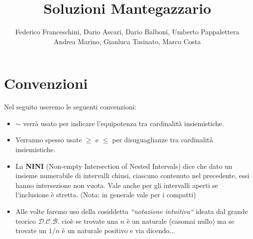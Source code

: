 \documentclass[a4paper,11pt]{article}
\title{Soluzioni Mantegazzario}
\author{Federico Franceschini, Dario Ascari, Dario Balboni, Umberto Pappalettera \\ 
Andrea Marino, Gianluca Tasinato, Marco Costa}
\newcommand{\equip}{\sim}
\newcommand{\NINI}{{\bf NINI }}
\begin{document}
\maketitle

\section*{Convenzioni}
Nel seguito useremo le seguenti convenzioni: \\
\begin{itemize}
\item $\equip$ verr\`a usato per indicare l'equipotenza tra cardinalit\`a insiemistiche.
\item Verranno spesso usate $\ge$ e $\le$ per disuguaglianze tra cardinalit\`a insiemistiche.
\item La \NINI (Non-empty Intersection of Nested Intervals) dice che dato un insieme numerabile di intervalli chiusi, ciascuno contenuto nel precedente, essi hanno intersezione non vuota. Vale anche per gli intervalli aperti se l'inclusione \`e stretta. (Nota: in generale vale per i compatti)
\item Alle volte faremo uso della cosiddetta {\it ``notazione intuitiva``} ideata dal grande teorico $\mathcal{D}$.$\mathcal{C}$.$\mathcal{B}$. cioè se trovate una $n$ è un naturale (casomai nullo) ma se trovate un $1/n$ è un naturale positivo e via dicendo... 
\end{itemize}
\end{document}
